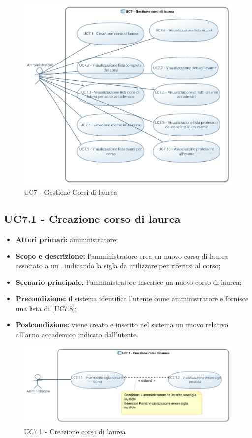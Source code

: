 \documentclass[AnalisiDeiRequisiti.tex]{subfiles}
\begin{document}
\begin{figure}[H]
	\centering
	\includegraphics[width=1.1\linewidth]{UC7.jpg}
	\caption{UC7 - Gestione Corsi di laurea}
	\label{fig:UC7 - Gestione Corsi di laurea}
\end{figure}

\subsection{UC7.1 - Creazione corso di laurea}
\begin{itemize}
	\item \textbf{Attori primari:} amministratore;
	\item \textbf{Scopo e descrizione:} l'amministratore crea un nuovo corso di laurea associato a un , indicando la sigla da utilizzare per riferirsi al corso;
	\item \textbf{Scenario principale:} l'amministratore inserisce un nuovo corso di laurea;
	\item \textbf{Precondizione:} il sistema identifica l'utente come amministratore e fornisce una lista di  [UC7.8];
	\item \textbf{Postcondizione:} viene creato e inserito nel sistema un nuovo  relativo all'anno accademico indicato dall'utente.
\end{itemize}

\begin{figure}[H]
	\centering
	\includegraphics[width=1.1\linewidth]{UC7_1.jpg}
	\caption{UC7.1 - Creazione corso di laurea}
	\label{fig:UC7.1 - Creazione corso di laurea}
\end{figure}
\end{document}
